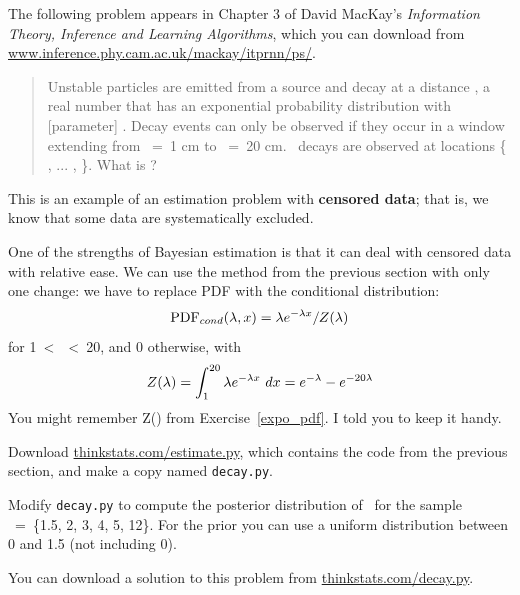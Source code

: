 \documentclass[12pt]{book}
\begin{document}
The following problem appears in Chapter 3 of David MacKay's
{\em Information Theory, Inference and Learning
  Algorithms}, which you can download from
\url{www.inference.phy.cam.ac.uk/mackay/itprnn/ps/}.

\begin{quote}
Unstable particles are emitted from a source and decay at a distance
\x, a real number that has an exponential probability distribution
with [parameter] \mylambda.  Decay events can
only be observed if they occur in a window extending from \x~=~1 cm to
\x~=~20 cm.  \n~decays are observed at locations \{ \x{}, ... , \x{}
\}.  What is \mylambda?

\end{quote}

This is an example of an estimation problem with {\bf censored data};
that is, we know that some data are systematically excluded.

One of the strengths of Bayesian estimation is that it can deal with
censored data with relative ease.  We can use the method from the
previous section with only one change: we have to replace
PDF with the conditional distribution:
%
\[ \mathrm{PDF}_{cond}(\lambda, x) = \lambda e^{-\lambda x} / Z(\lambda)  \]
%
for 1~<~\x~<~20, and 0 otherwise, with
%
\[ Z(\lambda) = \int_1^{20} \lambda e^{-\lambda x} ~ dx = 
e^{-\lambda} - e^{-20 \lambda}  \]
%
You might remember Z(\mylambda) from Exercise~\ref{expo_pdf}.  I told
you to keep it handy.

\begin{exercise}
Download \url{thinkstats.com/estimate.py}, which contains the code
from the previous section, and make a copy named {\tt decay.py}.

Modify {\tt decay.py} to compute the posterior distribution of
\mylambda~for the sample \X~=~\{1.5, 2, 3, 4, 5, 12\}.  For
the prior you can use a uniform distribution between 0
and 1.5 (not including 0).

You can download a solution to this problem from
\url{thinkstats.com/decay.py}.

\end{exercise}
\end{document}
